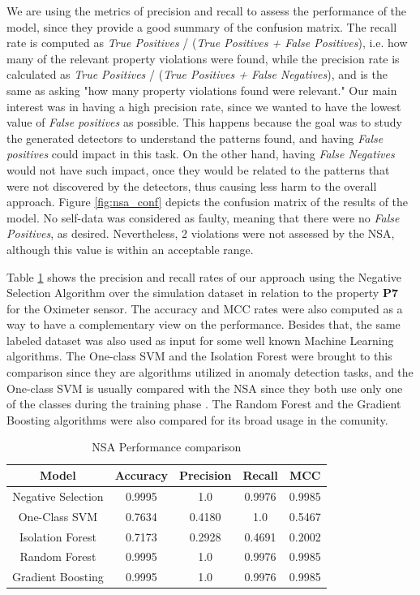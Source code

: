 We are using the metrics of precision and recall to assess the performance of the model, since they provide a good summary of the confusion matrix. The recall rate is computed as \textit{True Positives} / (\textit{True Positives + False Positives}), i.e. how many of the relevant property violations were found, while the precision rate is calculated as \textit{True Positives} / (\textit{True Positives + False Negatives}), and is the same as asking "how many property violations found were relevant." Our main interest was in having a high precision rate, since we wanted to have the lowest value of \textit{False positives} as possible. This happens because the goal was to study the generated detectors to understand the patterns found, and having \textit{False positives} could impact in this task. On the other hand, having \textit{False Negatives} would not have such impact, once they would be related to the patterns that were not discovered by the detectors, thus causing less harm to the overall approach. Figure \ref{fig:nsa_conf} depicts the confusion matrix of the results of the model. No self-data was considered as faulty, meaning that there were no \textit{False Positives}, as desired. Nevertheless, 2 violations were not assessed by the NSA, although this value is within an acceptable range.


Table \ref{tab:ev_comparison} shows the precision and recall rates of our approach using the Negative Selection Algorithm over the simulation dataset in relation to the property \textbf{P7}
for the Oximeter sensor. The accuracy and MCC rates were also computed as a way to have a complementary view on the performance. Besides that, the same labeled dataset was also used as input for some well known Machine Learning algorithms. The One-class SVM and the Isolation Forest were brought to this comparison since they are algorithms utilized in anomaly detection tasks, and the One-class SVM is usually compared with the NSA since they both use only one of the classes during the training phase \cite{NSAResearch2021}. The Random Forest and the Gradient Boosting algorithms were also compared for its broad usage in the comunity. 

\begin{table}[!h]
    \centering
    \begin{tabular}{ccccc}
    \hline
    Model              & Accuracy & Precision & Recall & MCC    \\ \hline
    Negative Selection & 0.9995   & 1.0       & 0.9976 & 0.9985 \\
    One-Class SVM      & 0.7634   & 0.4180    & 1.0    & 0.5467 \\
    Isolation Forest   & 0.7173   & 0.2928    & 0.4691 & 0.2002 \\
    Random Forest      & 0.9995   & 1.0       & 0.9976 & 0.9985 \\
    Gradient Boosting  & 0.9995   & 1.0       & 0.9976 & 0.9985 \\ \hline
    \end{tabular}
    \caption{NSA Performance comparison}
    \label{tab:ev_comparison}
\end{table}

